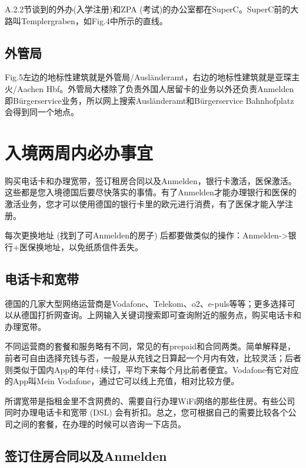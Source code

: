     A.2.2节谈到的外办(入学注册)和ZPA (考试)的办公室都在SuperC。SuperC前的大路叫Templergraben，如Fig.4中所示的直线。

  \subsection{外管局}\label{subsec:外管局}

    Fig.5左边的地标性建筑就是外管局/Ausländeramt，右边的地标性建筑就是亚琛主火/Aachen Hbf。外管局大楼除了负责外国人居留卡的业务以外还负责Anmelden即Bürgerservice业务，所以网上搜索Ausländeramt和Bürgerservice Bahnhofplatz会得到同一个地点。

\section{入境两周内必办事宜}\label{sec:入境两周内必办事宜}

  购买电话卡和办理宽带，签订租房合同以及Anmelden，银行卡激活，医保激活。这些都是您入境德国后要尽快落实的事情。有了Anmelden才能办理银行和医保的激活业务，您才可以使用德国的银行卡里的欧元进行消费，有了医保才能入学注册。

  每次更换地址 (找到了可Anmelden的房子) 后都要做类似的操作：Anmelden->银行+医保换地址，以免纸质信件丢失。

  \subsection{电话卡和宽带}\label{subsec:电话卡和宽带}

    德国的几家大型网络运营商是Vodafone、Telekom、o2、e-puls等等；更多选择可以从德国打折网查询。上网输入关键词搜索即可查询附近的服务点，购买电话卡和办理宽带。

    不同运营商的套餐和服务略有不同，常见的有prepaid和合同两类。简单解释是，前者可自由选择充钱与否，一般是从充钱之日算起一个月内有效，比较灵活；后者则类似于国内App的年付+续订，平均下来每个月比前者便宜。Vodafone有它对应的App叫Mein Vodafone，通过它可以线上充值，相对比较方便。

    所谓宽带是指租金里不含网费的、需要自行办理WiFi网络的那些住房。有些公司同时办理电话卡和宽带 (DSL) 会有折扣。总之，您可根据自己的需要比较各个公司之间的套餐，在办理的时候可以咨询一下店员。

  \subsection{签订住房合同以及Anmelden}\label{subsec:签订住房合同以及Anmelden}

